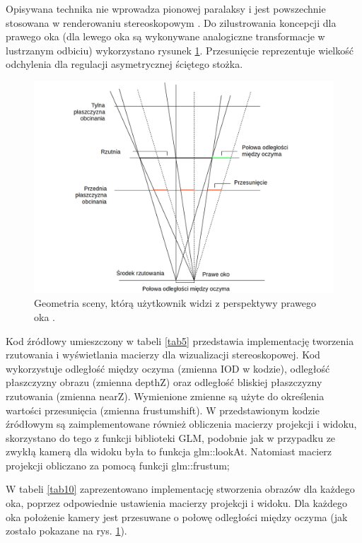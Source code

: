 Opisywana technika nie wprowadza pionowej paralaksy i jest powszechnie stosowana w renderowaniu stereoskopowym \cite{openglCookbook}. Do zilustrowania koncepcji dla prawego oka (dla lewego oka są wykonywane analogiczne transformacje w lustrzanym odbiciu) wykorzystano rysunek \ref{rys10}. Przesunięcie reprezentuje wielkość odchylenia dla regulacji asymetrycznej ściętego stożka.

\begin{figure}[H]
		\centering
 		\includegraphics[width=12cm]{stereoscopicGL.png}
    	\caption{Geometria sceny, którą użytkownik widzi z perspektywy prawego oka \cite{openglCookbook}.}
 		\label{rys10}
\end{figure}

Kod źródłowy umieszczony w tabeli \ref{tab5} przedstawia implementację tworzenia rzutowania i wyświetlania macierzy dla wizualizacji stereoskopowej. Kod wykorzystuje odległość między oczyma (zmienna IOD w kodzie), odległość płaszczyzny obrazu (zmienna depthZ) oraz odległość bliskiej płaszczyzny rzutowania (zmienna nearZ). Wymienione zmienne są użyte do określenia wartości przesunięcia (zmienna frustumshift). W przedstawionym kodzie źródłowym są zaimplementowane również obliczenia macierzy projekcji i widoku, skorzystano do tego z funkcji biblioteki GLM, podobnie jak w przypadku ze zwykłą kamerą dla widoku była to funkcja glm::lookAt. Natomiast macierz projekcji obliczano za pomocą funkcji glm::frustum;

W tabeli \ref{tab10} zaprezentowano implementację stworzenia obrazów dla każdego oka, poprzez odpowiednie ustawienia macierzy projekcji i widoku. Dla każdego oka położenie kamery jest przesuwane o połowę odległości między oczyma (jak zostało pokazane na rys. \ref{rys10}).

